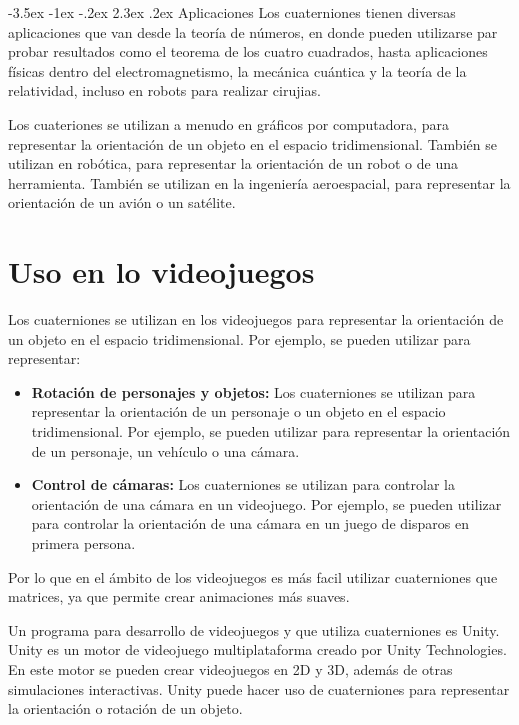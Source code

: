 \documentclass[11pt]{report}
\makeatletter
\renewcommand\chapter{\@startsection{chapter}{0}{\z@}%
    {-3.5ex \@plus -1ex \@minus -.2ex}%
    {2.3ex \@plus.2ex}%
    {\normalfont\Large\bfseries}}
\makeatother
\begin{document}
\newpage

\chapter{Aplicaciones}
Los cuaterniones tienen diversas aplicaciones que van desde la teoría de números, en donde pueden utilizarse par probar resultados como el teorema de los cuatro cuadrados,
hasta aplicaciones físicas dentro del electromagnetismo, la mecánica cuántica y la teoría de la relatividad, incluso en robots para realizar cirujias.

Los cuateriones se utilizan a menudo en gráficos por computadora, para representar la orientación de un objeto en el espacio tridimensional. También se utilizan en robótica,
para representar la orientación de un robot o de una herramienta. También se utilizan en la ingeniería aeroespacial, para representar la orientación de un avión o un satélite.

\section{Uso en lo videojuegos}
Los cuaterniones se utilizan en los videojuegos para representar la orientación de un objeto en el espacio tridimensional. Por ejemplo, se pueden utilizar para representar:
\begin{itemize}
  \item \textbf{Rotación de personajes y objetos: } Los cuaterniones se utilizan para representar la orientación de un personaje o un objeto en el espacio tridimensional.
        Por ejemplo, se pueden utilizar para representar la orientación de un personaje, un vehículo o una cámara.
  \item \textbf{Control de cámaras: } Los cuaterniones se utilizan para controlar la orientación de una cámara en un videojuego. Por ejemplo, se pueden utilizar para controlar
        la orientación de una cámara en un juego de disparos en primera persona.
\end{itemize}

Por lo que en el ámbito de los videojuegos es más facil utilizar cuaterniones que matrices, ya que permite crear animaciones más suaves.

Un programa para desarrollo de videojuegos y que utiliza cuaterniones es Unity. Unity es un motor de videojuego multiplataforma creado por Unity Technologies. En este motor
se pueden crear videojuegos en 2D y 3D, además de otras simulaciones interactivas. Unity puede hacer uso de cuaterniones para representar la orientación o rotación de un objeto.
\end{document}
